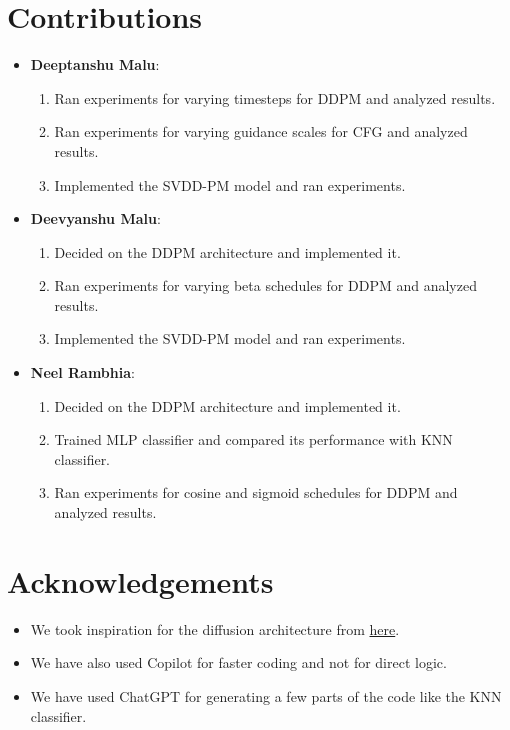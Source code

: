 \documentclass[11pt]{article}
\begin{document}
\section*{Contributions}

\begin{itemize}
    \item \textbf{Deeptanshu Malu}:
    \begin{enumerate}
        \item Ran experiments for varying timesteps for DDPM and analyzed results.
        \item Ran experiments for varying guidance scales for CFG and analyzed results.
        \item Implemented the SVDD-PM model and ran experiments.
    \end{enumerate}

    \item \textbf{Deevyanshu Malu}:
    \begin{enumerate}
        \item Decided on the DDPM architecture and implemented it.
        \item Ran experiments for varying beta schedules for DDPM and analyzed results.
        \item Implemented the SVDD-PM model and ran experiments.
    \end{enumerate}

    \item \textbf{Neel Rambhia}:
    \begin{enumerate}
        \item Decided on the DDPM architecture and implemented it.
        \item Trained MLP classifier and compared its performance with KNN classifier.
        \item Ran experiments for cosine and sigmoid schedules for DDPM and analyzed results.
    \end{enumerate}
\end{itemize}

\section*{Acknowledgements}

\begin{itemize}
    \item We took inspiration for the diffusion architecture from \href{https://github.com/albarji/toy-diffusion/blob/master/swissRoll.ipynb}{here}.
    \item We have also used Copilot for faster coding and not for direct logic.
    \item We have used ChatGPT for generating a few parts of the code like the KNN classifier.
\end{itemize}
\end{document}
